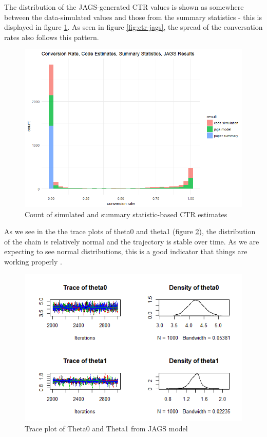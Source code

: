  The distribution of the JAGS-generated CTR values is shown as somewhere between the data-simulated values and those from the summary statistics - this is displayed in figure \ref{fig:conv-jags}. As seen in figure \ref{fig:ctr-jags}, the spread of the conversation rates also follows this pattern.

\begin{figure}[!h]
    \centering
    \includegraphics[scale = 0.55]{conv_jags_plot.png}
    \caption{Count of simulated and summary statistic-based CTR estimates}
    \label{fig:conv-jags}
\end{figure}

As we see in the the trace plots of theta0 and theta1 (figure \ref{fig:trace-theta0}), the distribution of the chain is relatively normal and the trajectory is stable over time. As we are expecting to see normal distributions, this is a good indicator that things are working properly \citep{MCMCDiagnostic}.

\begin{figure}[!h]
    \centering
    \includegraphics[scale = 0.65]{theta0_trace.png}
    \caption{Trace plot of Theta0 and Theta1 from JAGS model}
    \label{fig:trace-theta0}
\end{figure}

